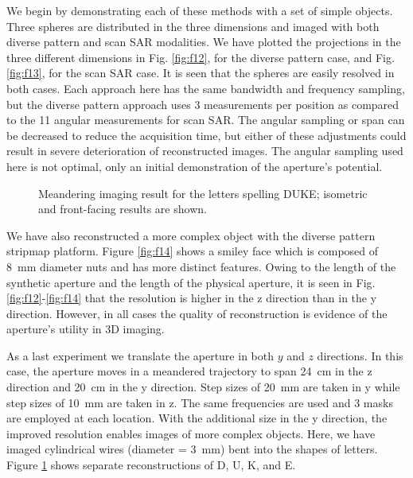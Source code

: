 \documentclass[journal]{IEEEtran}
\begin{document}
We begin by demonstrating each of these methods with a set of simple objects. Three spheres are distributed in the three dimensions and imaged with both diverse pattern and scan SAR modalities. We have plotted the projections in the three different dimensions in Fig. \ref{fig:f12}, for the diverse pattern case, and Fig. \ref{fig:f13}, for the scan SAR case. It is seen that the spheres are easily resolved in both cases. Each approach here has the same bandwidth and frequency sampling, but the diverse pattern approach uses 3 measurements per position as compared to the 11 angular measurements for scan SAR. The angular sampling or span can be decreased to reduce the acquisition time, but either of these adjustments could result in severe deterioration of reconstructed images.  The angular sampling used here is not optimal, only an initial demonstration of the aperture's potential.

\begin{figure}
	\centering
	\caption{\label{fig:f15}Meandering imaging result for the letters spelling DUKE; isometric and front-facing results are shown.}
\end{figure}

We have also reconstructed a more complex object with the diverse pattern stripmap platform. Figure \ref{fig:f14} shows a smiley face which is composed of \SI{8}{\milli\meter} diameter nuts and has more distinct features. Owing to the length of the synthetic aperture and the length of the physical aperture, it is seen in Fig. \ref{fig:f12}-\ref{fig:f14} that the resolution is higher in the z direction than in the y direction. However, in all cases the quality of reconstruction is evidence of the aperture's utility in 3D imaging.

As a last experiment we translate the aperture in both $y$ and $z$ directions. In this case, the aperture moves in a meandered trajectory to span \SI{24}{\centi\meter} in the z direction and \SI{20}{\centi\meter} in the y direction. Step sizes of \SI{20}{\milli\meter} are taken in y while step sizes of \SI{10}{\milli\meter} are taken in z. The same frequencies are used and 3 masks are employed at each location. With the additional size in the y direction, the improved resolution enables images of more complex objects. Here, we have imaged cylindrical wires (diameter = \SI{3}{\milli\meter}) bent into the shapes of letters. Figure \ref{fig:f15} shows separate reconstructions of D, U, K, and E.
\end{document}
